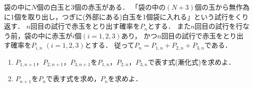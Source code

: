 \documentclass[../../main.tex]{subfiles}
\begin{document}
袋の中に$N$個の白玉と3個の赤玉がある．
「袋の中の$(N+3)$個の玉から無作為に1個を取り出し，つぎに(外部にある)白玉を1個袋に入れる」という試行をくり返す．
$n$回目の試行で赤玉をとり出す確率を$P_n$とする．
また$n$回目の試行を行なう前，袋の中に赤玉が$i$個$(i=1,2,3)$あり，
かつ$n$回目の試行で赤玉をとり出す確率を$P_{i,n}$ $(i=1,2,3)$とする．
従って$P_n=P_{1,n}+P_{2,n}+P_{3,n}$である．
\begin{enumerate}
  \item $P_{1,n+1}$，$P_{2,n+1}$，$P_{3,n+1}$を$P_{1,n}$，$P_{2,n}$，$P_{3,n}$で表す式(漸化式)を求めよ．
  \item $P_{n+1}$を$P_n$で表す式を求め，$P_n$を求めよ．
\end{enumerate}
\end{document}
